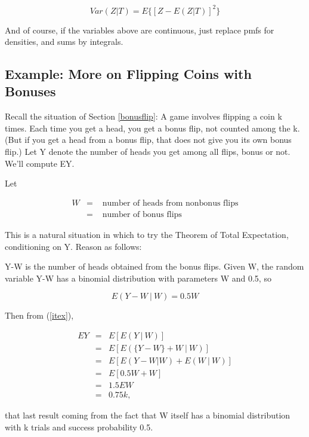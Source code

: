 \begin{equation}
Var(Z | T) = E\{[Z - E(Z|T)]^2\}
\end{equation}

And of course, if the variables above are continuous, just replace pmfs
for densities, and sums by integrals.

\subsection{Example:  More on Flipping Coins with Bonuses}

Recall the situation of Section \ref{bonusflip}:  A game involves
flipping a coin k times.  Each time you get a head, you get a bonus
flip, not counted among the k.  (But if you get a head from a bonus
flip, that does not give you its own bonus flip.) Let Y denote the
number of heads you get among all flips, bonus or not.   We'll compute
EY.

Let

\begin{eqnarray}
W &=& \textrm{ number of heads from nonbonus flips} \\ 
  &=& \textrm{ number of bonus flips} 
\end{eqnarray}

This is a natural situation in which to try the Theorem of Total
Expectation, conditioning on Y.  Reason as follows:

Y-W is the number of heads obtained from the bonus flips.  Given W, the
random variable Y-W has a binomial distribution with parameters W and
0.5, so 

\begin{equation}
E(Y-W ~|~ W) = 0.5 W
\end{equation}

Then from (\ref{itex}),

\begin{eqnarray}
EY &=& E[E(Y ~|~ W)] \\ 
&=& E \left [E ( \{ Y-W \} + W ~|~ W ) \right ] \\
&=& E \left [E (Y-W | W) + E(W ~|~ W ) \right ] \\
&=& E \left [ 0.5W + W \right ] \\
&=& 1.5 EW \\
&=& 0.75 k,
\end{eqnarray}

that last result coming from the fact that W itself has a binomial
distribution with k trials and success probability 0.5.

